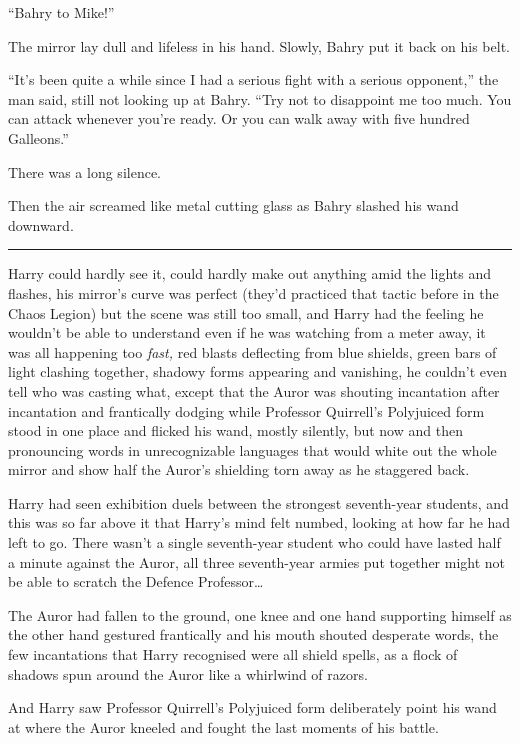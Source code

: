 ``Bahry to Mike!''

The mirror lay dull and lifeless in his hand. Slowly, Bahry put it back
on his belt.

``It's been quite a while since I had a serious fight with a serious
opponent,'' the man said, still not looking up at Bahry. ``Try not to
disappoint me too much. You can attack whenever you're ready. Or you can
walk away with five hundred Galleons.''

There was a long silence.

Then the air screamed like metal cutting glass as Bahry slashed his wand
downward.

\begin{center}\rule{3in}{0.4pt}\end{center}

Harry could hardly see it, could hardly make out anything amid the
lights and flashes, his mirror's curve was perfect (they'd practiced
that tactic before in the Chaos Legion) but the scene was still too
small, and Harry had the feeling he wouldn't be able to understand even
if he was watching from a meter away, it was all happening too
\emph{fast,} red blasts deflecting from blue shields, green bars of
light clashing together, shadowy forms appearing and vanishing, he
couldn't even tell who was casting what, except that the Auror was
shouting incantation after incantation and frantically dodging while
Professor Quirrell's Polyjuiced form stood in one place and flicked his
wand, mostly silently, but now and then pronouncing words in
unrecognizable languages that would white out the whole mirror and show
half the Auror's shielding torn away as he staggered back.

Harry had seen exhibition duels between the strongest seventh-year
students, and this was so far above it that Harry's mind felt numbed,
looking at how far he had left to go. There wasn't a single seventh-year
student who could have lasted half a minute against the Auror, all three
seventh-year armies put together might not be able to scratch the
Defence Professor\ldots{}

The Auror had fallen to the ground, one knee and one hand supporting
himself as the other hand gestured frantically and his mouth shouted
desperate words, the few incantations that Harry recognised were all
shield spells, as a flock of shadows spun around the Auror like a
whirlwind of razors.

And Harry saw Professor Quirrell's Polyjuiced form deliberately point
his wand at where the Auror kneeled and fought the last moments of his
battle.

